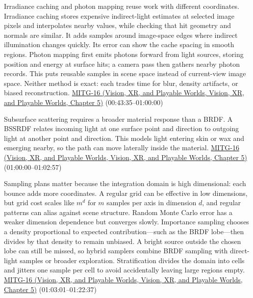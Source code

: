 Irradiance caching and photon mapping reuse work with different coordinates. Irradiance caching stores expensive indirect-light estimates at selected image pixels and interpolates nearby values, while checking that hit geometry and normals are similar. It adds samples around image-space edges where indirect illumination changes quickly. Its error can show the cache spacing in smooth regions. Photon mapping first emits photons forward from light sources, storing position and energy at surface hits; a camera pass then gathers nearby photon records. This puts reusable samples in scene space instead of current-view image space. Neither method is exact: each trades time for blur, density artifacts, or biased reconstruction. \href{../07-Vision-XR-and-Playable-Worlds/main.pdf\#nameddest=04-visual-computing-ii-ch036-mitg-16---global-illumination}{MITG-16 (Vision, XR, and Playable Worlds, Vision, XR, and Playable Worlds, Chapter 5)} (00:43:35--01:00:00)

Subsurface scattering requires a broader material response than a BRDF. A BSSRDF relates incoming light at one surface point and direction to outgoing light at another point and direction. This models light entering skin or wax and emerging nearby, so the path can move laterally inside the material. \href{../07-Vision-XR-and-Playable-Worlds/main.pdf\#nameddest=04-visual-computing-ii-ch036-mitg-16---global-illumination}{MITG-16 (Vision, XR, and Playable Worlds, Vision, XR, and Playable Worlds, Chapter 5)} (01:00:00--01:02:57)

Sampling plans matter because the integration domain is high dimensional: each bounce adds more coordinates. A regular grid can be effective in low dimensions, but grid cost scales like \(m^d\) for \(m\) samples per axis in dimension \(d\), and regular patterns can alias against scene structure. Random Monte Carlo error has a weaker dimension dependence but converges slowly. Importance sampling chooses a density proportional to expected contribution---such as the BRDF lobe---then divides by that density to remain unbiased. A bright source outside the chosen lobe can still be missed, so hybrid samplers combine BRDF sampling with direct-light samples or broader exploration. Stratification divides the domain into cells and jitters one sample per cell to avoid accidentally leaving large regions empty. \href{../07-Vision-XR-and-Playable-Worlds/main.pdf\#nameddest=04-visual-computing-ii-ch036-mitg-16---global-illumination}{MITG-16 (Vision, XR, and Playable Worlds, Vision, XR, and Playable Worlds, Chapter 5)} (01:03:01--01:22:37)

